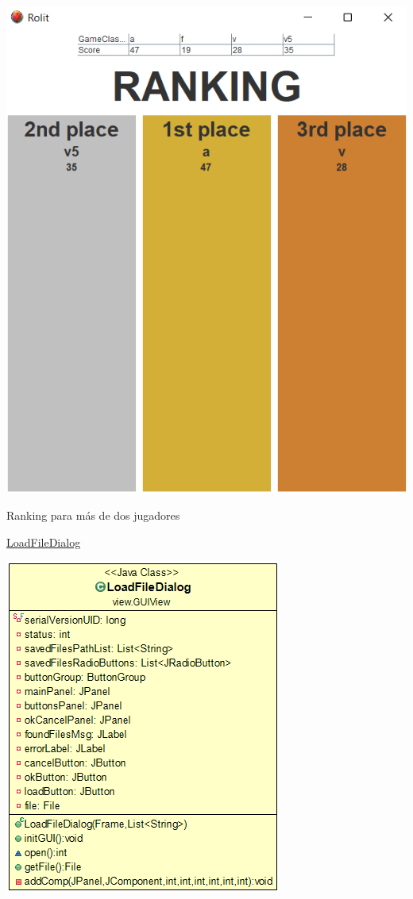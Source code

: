 \documentclass[12pt,a4paper,openright]{book}
\theoremstyle{break}
\begin{document}
\begin{center}
\includegraphics[scale=0.7]{ranking-3players.png}

Ranking para más de dos jugadores
\end{center}

\newpage

\underline{LoadFileDialog}
\begin{center}
\includegraphics[scale=0.6]{loaddialoguml.png}
\end{center}
\end{document}
